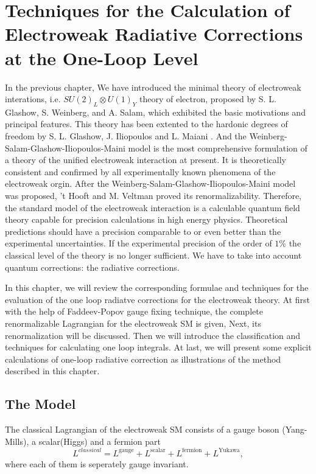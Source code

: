 
\chapter{Techniques for the Calculation of Electroweak Radiative Corrections at the One-Loop Level}

In the previous chapter, We have introduced the minimal theory of electroweak interations, i.e. $SU(2)_L\otimes U(1)_Y$ theory of electron, proposed by S. L. Glashow\cite{Glashow1961}, S. Weinberg\cite{Weinberg}, and A. Salam\cite{Salam}, which exhibited the basic motivations and principal features. This theory has been extented to the hardonic degrees of freedom by S. L. Glashow, J. Iliopoulos and L. Maiani \cite{GIM}.
And the Weinberg-Salam-Glashow-Iliopoulos-Maini model is the most comprehensive formulation of a theory of the unified electroweak interaction at present. It is theoretically consistent and confirmed by all experimentally known phenomena of the electroweak orgin. After the Weinberg-Salam-Glashow-Iliopoulos-Maini model was proposed, 't Hooft and M. Veltman proved its renormalizability\cite{thooft1,thooft2,tHooftVeltman,tHV}. Therefore, the standard model of the electroweak interaction is a calculable quantum field theory capable for precision calculations in high energy physics. Theoretical predictions should have a precision comparable to or even better than the experimental uncertainties. If the experimental precision of the order of $1\%$ the classical level of the theory is no longer sufficient. We have to take into account quantum corrections: the radiative corrections. 

In this chapter, we will review the corresponding formulae and techniques for the evaluation of the one loop radiatve corrections for the electroweak theory\cite{Denner,PV,DG,Consoli,MV,GV,BRJ,SovJ}. At first with the help of Faddeev-Popov gauge fixing technique, the complete renormalizable Lagrangian for the electroweak SM is given, Next, its renormalization will be discussed. Then we will introduce the classification and techniques for calculating one loop integrals.
At last, we will present some explicit calculations of one-loop radiative correction as illustrations of the method described in this chapter.

\section{The Model}

The classical Lagrangian of the electroweak SM consists of a gauge boson (Yang-Mills), a scalar(Higgs) and a fermion part
\begin{equation}
L^{classical}=L^{\text{gauge}}+L^\text{scalar}+L^{\text{fermion}}+L^\text{Yukawa}, 
\end{equation}
where each of them is seperately gauge invariant. 

